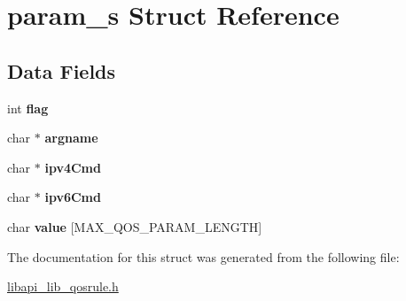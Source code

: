 \hypertarget{structparam__s}{}\section{param\+\_\+s Struct Reference}
\label{structparam__s}
\subsection*{Data Fields}
\begin{DoxyCompactItemize}
\item 
\mbox{\label{structparam__s_af5e30a6fd825d4ae3651878a654ca81f}} 
int {\bfseries flag}
\item 
\mbox{\label{structparam__s_adcec6c3d138da6dc95a7644b47acccea}} 
char $\ast$ {\bfseries argname}
\item 
\mbox{\label{structparam__s_a308cba9032600e3d0aa6ca7fda8e3b8d}} 
char $\ast$ {\bfseries ipv4\+Cmd}
\item 
\mbox{\label{structparam__s_a8f5a3e54d4cf433bf694a98c262201d5}} 
char $\ast$ {\bfseries ipv6\+Cmd}
\item 
\mbox{\label{structparam__s_a7df65f5bc8b59b45b11452df5392f2fc}} 
char {\bfseries value} \mbox{[}M\+A\+X\+\_\+\+Q\+O\+S\+\_\+\+P\+A\+R\+A\+M\+\_\+\+L\+E\+N\+G\+TH\mbox{]}
\end{DoxyCompactItemize}


The documentation for this struct was generated from the following file\+:\begin{DoxyCompactItemize}
\item 
\hyperlink{libapi__lib__qosrule_8h}{libapi\+\_\+lib\+\_\+qosrule.\+h}\end{DoxyCompactItemize}
